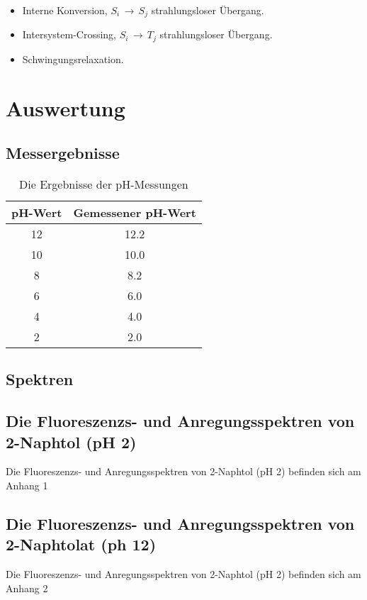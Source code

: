 \documentclass[12pt]{article}
\begin{document}
\begin{itemize}
  \item[]  Interne Konversion,
    $S_i\,\longrightarrow\,S_j$ strahlungsloser Übergang.

  \item[]  Intersystem-Crossing,
    $S_i\,\longrightarrow\,T_j$ strahlungsloser Übergang.

  \item[]  
    Schwingungsrelaxation.
\end{itemize}


\section{Auswertung}
\subsection{Messergebnisse}
\begin{table}[!ht]
  \begin{tabular}{cc}
    pH-Wert & Gemessener pH-Wert   \\
    \hline
    12 &  12.2    \\
    10 &  10.0 \\
    8  &   8.2  \\
    6  &   6.0 \\
    4  &   4.0  \\
    2  &   2.0  \\
  \end{tabular}
  \caption{ Die Ergebnisse der pH-Messungen}
\end{table}
\subsection{Spektren}
\subsection{Die Fluoreszenzs- und Anregungsspektren von 2-Naphtol (pH 2)}
Die Fluoreszenzs- und Anregungsspektren von 2-Naphtol (pH 2) befinden sich am Anhang 1
\subsection{Die Fluoreszenzs- und Anregungsspektren von 2-Naphtolat (ph 12)}
Die Fluoreszenzs- und Anregungsspektren von 2-Naphtol (pH 2) befinden sich am Anhang 2
\end{document}
